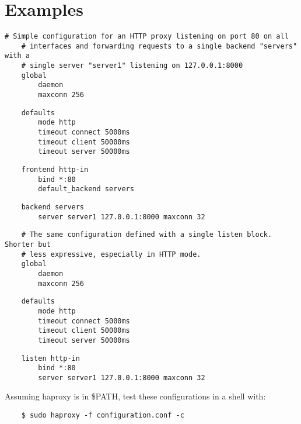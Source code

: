 
\section{Examples}
\begin{verbatim}
# Simple configuration for an HTTP proxy listening on port 80 on all
    # interfaces and forwarding requests to a single backend "servers" with a
    # single server "server1" listening on 127.0.0.1:8000
    global
        daemon
        maxconn 256
\end{verbatim}

\begin{verbatim}
    defaults
        mode http
        timeout connect 5000ms
        timeout client 50000ms
        timeout server 50000ms
\end{verbatim}

\begin{verbatim}
    frontend http-in
        bind *:80
        default_backend servers
\end{verbatim}

\begin{verbatim}
    backend servers
        server server1 127.0.0.1:8000 maxconn 32
\end{verbatim}

\begin{verbatim}
    # The same configuration defined with a single listen block. Shorter but
    # less expressive, especially in HTTP mode.
    global
        daemon
        maxconn 256
\end{verbatim}

\begin{verbatim}
    defaults
        mode http
        timeout connect 5000ms
        timeout client 50000ms
        timeout server 50000ms
\end{verbatim}

\begin{verbatim}
    listen http-in
        bind *:80
        server server1 127.0.0.1:8000 maxconn 32
\end{verbatim}


Assuming haproxy is in \$PATH, test these configurations in a shell with:

\begin{verbatim}
    $ sudo haproxy -f configuration.conf -c
\end{verbatim}

